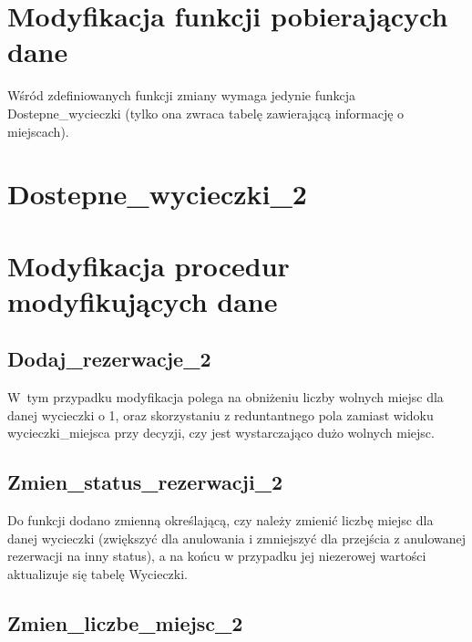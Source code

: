 \documentclass[12pt, a4paper]{mwrep}
\begin{document}


\section{Modyfikacja funkcji pobierających dane}

Wśród zdefiniowanych funkcji zmiany wymaga jedynie funkcja Dostepne\_wycieczki (tylko ona zwraca tabelę zawierającą informację o miejscach).

\section{Dostepne\_wycieczki\_2}



\section{Modyfikacja procedur modyfikujących dane}

\subsection{Dodaj\_rezerwacje\_2}



W~tym przypadku modyfikacja polega na obniżeniu liczby wolnych miejsc dla danej wycieczki o 1, oraz skorzystaniu z reduntantnego pola zamiast widoku wycieczki\_miejsca przy decyzji, czy jest wystarczająco dużo wolnych miejsc.

\subsection{Zmien\_status\_rezerwacji\_2}



Do funkcji dodano zmienną określającą, czy należy zmienić liczbę miejsc dla danej wycieczki (zwiększyć dla anulowania i zmniejszyć dla przejścia z anulowanej rezerwacji na inny status), a na końcu w przypadku jej niezerowej wartości aktualizuje się tabelę Wycieczki.

\subsection{Zmien\_liczbe\_miejsc\_2}


\end{document}
